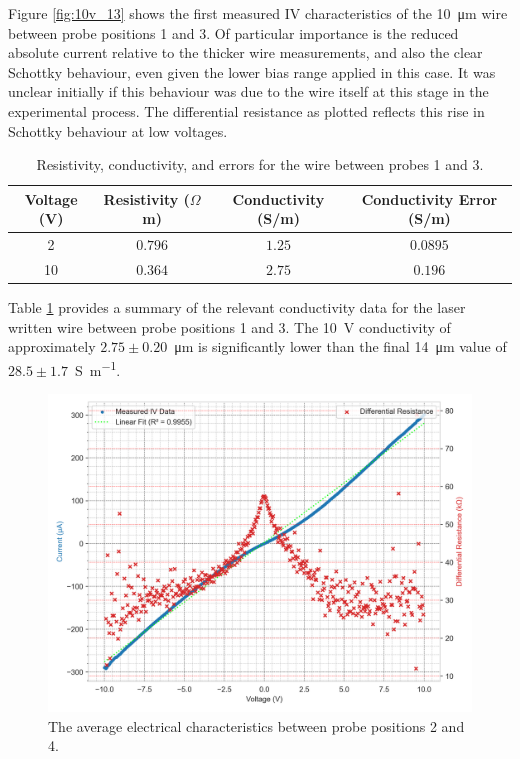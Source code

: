 \begin{refsection}
Figure \ref{fig:10v_13} shows the first measured IV characteristics of the 10~\si{\micro\metre} wire between probe positions 1 and 3. Of particular importance is the reduced absolute current relative to the thicker wire measurements, and also the clear Schottky behaviour, even given the lower bias range applied in this case. It was unclear initially if this behaviour was due to the wire itself at this stage in the experimental process. The differential resistance as plotted reflects this rise in Schottky behaviour at low voltages.

\begin{table}[ht]
\centering
\begin{tabular}{|c|c|c|c|}
\hline
Voltage (V) & Resistivity ($\Omega$m) & Conductivity (S/m) & Conductivity Error (S/m) \\
\hline
2 & $0.796$ & $1.25$ & $0.0895$ \\
10 & $0.364$ & $2.75$ & $0.196$ \\
\hline
\end{tabular}
\caption{Resistivity, conductivity, and errors for the wire between probes 1 and 3.}
\label{table:13_resistivity_conductivity_updated}
\end{table}

Table \ref{table:13_resistivity_conductivity_updated} provides a summary of the relevant conductivity data for the laser written wire between probe positions 1 and 3. The 10~\si{\volt} conductivity of approximately $2.75\pm0.20$~\si{\micro\metre} is significantly lower than the final 14~\si{\micro\metre} value of $28.5\pm1.7$~\si{\siemens\per\metre}.

\begin{figure}[H]
    \centering
    \includegraphics[width=\linewidth]{Chapter7/Figs/Raster/10V 24 d.png}
    \caption{The average electrical characteristics between probe positions 2 and 4.}
    \label{fig:10v_24}
\end{figure}


\end{refsection}

